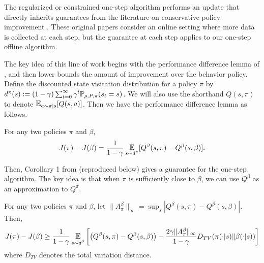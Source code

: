 \begin{subappendices}
\label{sec:app_improvement}


The regularized or constrained one-step algorithm performs an update that directly inherits guarantees from the literature on conservative policy improvement \citep{kakade2002approximately, schulman2015trust, achiam2017constrained}. These original papers consider an online setting where more data is collected at each step, but the guarantee at each step applies to our one-step offline algorithm.

The key idea of this line of work begins with the performance difference lemma of \cite{kakade2002approximately}, and then lower bounds the amount of improvement over the behavior policy. Define the discounted state visitation distribution for a policy $ \pi$ by $ d^\pi(s) := (1-\gamma) \sum_{t=0}^\infty \gamma^t \mathbb{P}_{\rho, P, \pi}(s_t = s)$. We will also use the shorthand $ Q(s, \pi) $ to denote $ \E_{a\sim\pi|s}[Q(s,a)]$. Then we have the performance difference lemma as follows.

\begin{lemma}
For any two policies $ \pi$ and $ \beta$,
\begin{align}
    J(\pi) - J(\beta) = \frac{1}{1-\gamma} \E_{\substack{s \sim d^\pi}}[ Q^\beta(s,\pi) - Q^\beta(s, \beta)]. %
\end{align}
\end{lemma}

Then, Corollary 1 from \cite{achiam2017constrained} (reproduced below) gives a guarantee for the one-step algorithm. The key idea is that when $ \pi $ is sufficiently close to $ \beta$, we can use $ Q^\beta$ as an approximation to $ Q^\pi$.
\begin{lemma}
For any two policies $ \pi$ and $ \beta$, let $ \|A^\beta_\pi\|_{\infty} = \sup_s  |Q^\beta(s,\pi) - Q^\beta(s, \beta)|$. Then,
    \begin{align}
        J(\pi) - J(\beta) \geq \frac{1}{1-\gamma} \E_{\substack{s \sim d^\beta}}\left[ \left(Q^\beta(s,\pi) - Q^\beta(s, \beta)\right) - \frac{2\gamma \|A^\beta_\pi\|_\infty}{1-\gamma} D_{TV}(\pi(\cdot|s)\|\beta(\cdot|s)) \right]
    \end{align}
where $ D_{TV}$ denotes the total variation distance.
\end{lemma}


\end{subappendices}
